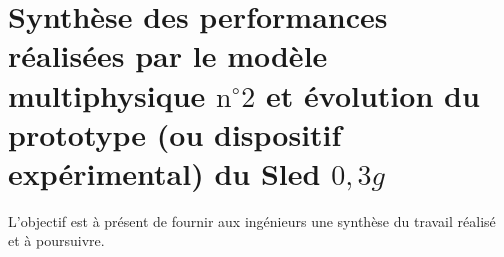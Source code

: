 
\section{Synthèse des performances réalisées par le modèle multiphysique $\mathrm{n}^{\circ} 2$ et évolution du prototype (ou dispositif expérimental) du Sled $0,3 g$ \label{ccs_mp_2022_sec_5}}
$\qquad$\\
L'objectif est à présent de fournir aux ingénieurs une synthèse du travail réalisé et à poursuivre.

